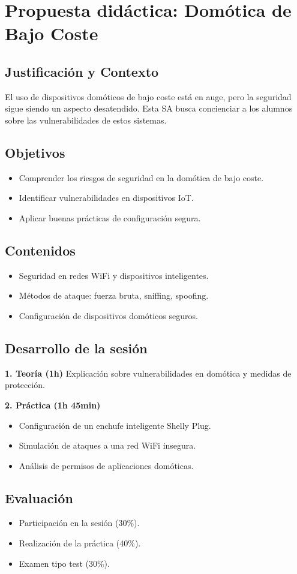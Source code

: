 \chapter{Propuesta didáctica: Domótica de Bajo Coste}
\section{Justificación y Contexto}
El uso de dispositivos domóticos de bajo coste está en auge, pero la seguridad sigue siendo un aspecto desatendido. Esta SA busca concienciar a los alumnos sobre las vulnerabilidades de estos sistemas.

\section{Objetivos}
\begin{itemize}
    \item Comprender los riesgos de seguridad en la domótica de bajo coste.
    \item Identificar vulnerabilidades en dispositivos IoT.
    \item Aplicar buenas prácticas de configuración segura.
\end{itemize}

\section{Contenidos}
\begin{itemize}
    \item Seguridad en redes WiFi y dispositivos inteligentes.
    \item Métodos de ataque: fuerza bruta, sniffing, spoofing.
    \item Configuración de dispositivos domóticos seguros.
\end{itemize}

\section{Desarrollo de la sesión}
\textbf{1. Teoría (1h)}  
Explicación sobre vulnerabilidades en domótica y medidas de protección.

\textbf{2. Práctica (1h 45min)}  
\begin{itemize}
    \item Configuración de un enchufe inteligente Shelly Plug.
    \item Simulación de ataques a una red WiFi insegura.
    \item Análisis de permisos de aplicaciones domóticas.
\end{itemize}

\section{Evaluación}
\begin{itemize}
    \item Participación en la sesión (30\%).
    \item Realización de la práctica (40\%).
    \item Examen tipo test (30\%).
\end{itemize}